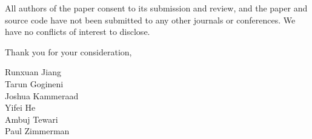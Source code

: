 \documentclass[twoside,11pt]{article}
\begin{document}
    
    
    \medskip
    
    All authors of the paper consent to its submission and review, and the paper and source code have not been submitted to any other journals or conferences. We have no conflicts of interest to disclose.
    
    \medskip
    
    \noindent Thank you for your consideration,
    
    \medskip

    \noindent Runxuan Jiang \\
    Tarun Gogineni \\
    Joshua Kammeraad \\
    Yifei He \\
    Ambuj Tewari \\
    Paul Zimmerman
    
    
\end{document}
